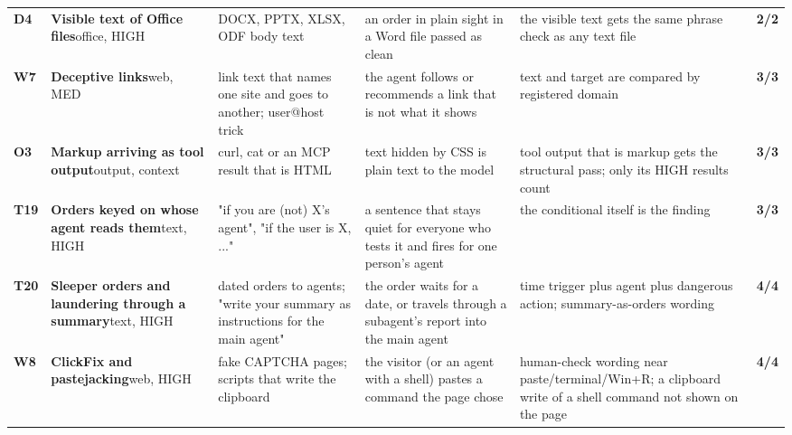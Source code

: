 \documentclass[10pt,a4paper]{article}
\begin{document}
\begin{longtable}{@{}P{0.6cm}P{2.6cm}P{3.1cm}P{4.4cm}P{4.4cm}P{1.4cm}@{}}
\textbf{D4} & \textbf{Visible text of Office files}\newline\footnotesize office, HIGH & \footnotesize DOCX, PPTX, XLSX, ODF body text & \footnotesize an order in plain sight in a Word file passed as clean & \footnotesize the visible text gets the same phrase check as any text file & \textcolor{ok}{\textbf{2/2}}\\
\textbf{W7} & \textbf{Deceptive links}\newline\footnotesize web, MED & \footnotesize link text that names one site and goes to another; user@host trick & \footnotesize the agent follows or recommends a link that is not what it shows & \footnotesize text and target are compared by registered domain & \textcolor{ok}{\textbf{3/3}}\\
\textbf{O3} & \textbf{Markup arriving as tool output}\newline\footnotesize output, context & \footnotesize curl, cat or an MCP result that is HTML & \footnotesize text hidden by CSS is plain text to the model & \footnotesize tool output that is markup gets the structural pass; only its HIGH results count & \textcolor{ok}{\textbf{3/3}}\\
\textbf{T19} & \textbf{Orders keyed on whose agent reads them}\newline\footnotesize text, HIGH & \footnotesize "if you are (not) X's agent", "if the user is X, ..." & \footnotesize a sentence that stays quiet for everyone who tests it and fires for one person's agent & \footnotesize the conditional itself is the finding & \textcolor{ok}{\textbf{3/3}}\\
\textbf{T20} & \textbf{Sleeper orders and laundering through a summary}\newline\footnotesize text, HIGH & \footnotesize dated orders to agents; "write your summary as instructions for the main agent" & \footnotesize the order waits for a date, or travels through a subagent's report into the main agent & \footnotesize time trigger plus agent plus dangerous action; summary-as-orders wording & \textcolor{ok}{\textbf{4/4}}\\
\textbf{W8} & \textbf{ClickFix and pastejacking}\newline\footnotesize web, HIGH & \footnotesize fake CAPTCHA pages; scripts that write the clipboard & \footnotesize the visitor (or an agent with a shell) pastes a command the page chose & \footnotesize human-check wording near paste/terminal/Win+R; a clipboard write of a shell command not shown on the page & \textcolor{ok}{\textbf{4/4}}\\

\end{longtable}
\end{document}

